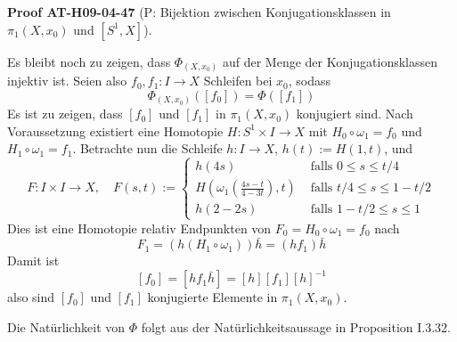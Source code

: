 \documentclass[10pt, letterpaper]{article}
\newcommand{\CustomHeading}[3]{%
  \par\medskip\noindent%
  \textbf{#1 #2} \textnormal{(#3)}.\enskip%
}
\newenvironment{PROOF}[2]{\CustomHeading{Proof}{#1}{#2}}{}
\begin{document}
\begin{PROOF}{AT-H09-04-47}{P: Bijektion zwischen Konjugationsklassen in $\pi_1\left(X, x_0\right)$ und $\left[S^1, X\right]$}
Es bleibt noch zu zeigen, dass $\Phi_{\left(X, x_0\right)}$ auf der Menge der Konjugationsklassen injektiv ist. Seien also $f_0, f_1: I \rightarrow X$ Schleifen bei $x_0$, sodass 
$$\Phi_{\left(X, x_0\right)}\left(\left[f_0\right]\right)=\Phi\left(\left[f_1\right]\right)$$ 
Es ist zu zeigen, dass $\left[f_0\right]$ und $\left[f_1\right]$ in $\pi_1\left(X, x_0\right)$ konjugiert sind. Nach Voraussetzung existiert eine Homotopie $H: S^1 \times I \rightarrow X$ mit $H_0 \circ \omega_1=f_0$ und $H_1 \circ \omega_1=f_1$. Betrachte nun die Schleife $h: I \rightarrow X$, $h(t):=H(1, t)$, und
$$
F: I \times I \rightarrow X, \quad F(s, t):= \begin{cases}h(4 s) & \text { falls } 0 \leq s \leq t / 4 \\ H\left(\omega_1\left(\frac{4 s-t}{4-3 t}\right), t\right) & \text { falls } t / 4 \leq s \leq 1-t / 2 \\ h(2-2 s) & \text { falls } 1-t / 2 \leq s \leq 1\end{cases}
$$
Dies ist eine Homotopie relativ Endpunkten von $F_0=H_0 \circ \omega_1=f_0$ nach 
$$F_1=\left(h\left(H_1 \circ \omega_1\right)\right) \bar{h}=\left(h f_1\right) \bar{h}$$ 
Damit ist 
$$\left[f_0\right]=\left[h f_1 \bar{h}\right]=[h]\left[f_1\right][h]^{-1}$$ 
also sind $\left[f_0\right]$ und $\left[f_1\right]$ konjugierte Elemente in $\pi_1\left(X, x_0\right)$. 

Die Natürlichkeit von $\Phi$ folgt aus der Natürlichkeitsaussage in Proposition I.3.32.
\end{PROOF}
\end{document}
